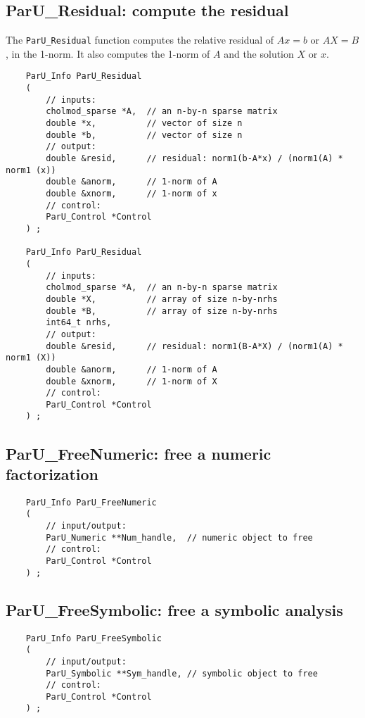\documentclass[12pt]{article}
\begin{document}
\subsection{{\sf ParU\_Residual}: compute the residual}

    The \verb'ParU_Residual' function computes the relative residual of
    $Ax=b$ or $AX=B$, in the 1-norm.  It also computes the 1-norm of $A$
    and the solution $X$ or $x$.

    {\footnotesize
    \begin{verbatim}
    ParU_Info ParU_Residual
    (
        // inputs:
        cholmod_sparse *A,  // an n-by-n sparse matrix
        double *x,          // vector of size n
        double *b,          // vector of size n
        // output:
        double &resid,      // residual: norm1(b-A*x) / (norm1(A) * norm1 (x))
        double &anorm,      // 1-norm of A
        double &xnorm,      // 1-norm of x
        // control:
        ParU_Control *Control
    ) ;

    ParU_Info ParU_Residual
    (
        // inputs:
        cholmod_sparse *A,  // an n-by-n sparse matrix
        double *X,          // array of size n-by-nrhs
        double *B,          // array of size n-by-nrhs
        int64_t nrhs,
        // output:
        double &resid,      // residual: norm1(B-A*X) / (norm1(A) * norm1 (X))
        double &anorm,      // 1-norm of A
        double &xnorm,      // 1-norm of X
        // control:
        ParU_Control *Control
    ) ; \end{verbatim} }

\subsection{{\sf ParU\_FreeNumeric}: free a numeric factorization}

    {\footnotesize
    \begin{verbatim}
    ParU_Info ParU_FreeNumeric
    (
        // input/output:
        ParU_Numeric **Num_handle,  // numeric object to free
        // control:
        ParU_Control *Control
    ) ; \end{verbatim} }

\subsection{{\sf ParU\_FreeSymbolic}: free a symbolic analysis}

    {\footnotesize
    \begin{verbatim}
    ParU_Info ParU_FreeSymbolic
    (
        // input/output:
        ParU_Symbolic **Sym_handle, // symbolic object to free
        // control:
        ParU_Control *Control
    ) ; \end{verbatim} }
\end{document}

